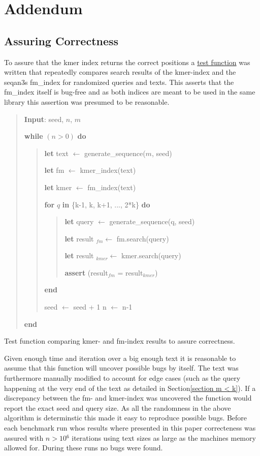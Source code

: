 
\chapter{Addendum}
\section{\label{Addendum: Correctness}Assuring Correctness}

To assure that the kmer index returns the correct positions a \href{https://github.com/google/googletest}{test function}
was written that repeatedly compares search results of the kmer-index and
the seqan3s fm\_index for randomized queries and texts. This asserts that the
fm\_index itself is bug-free and as both indices are meant to be used
in the same library this assertion was presumed to be reasonable.

\begin{algorithm}[H]
\begin{verse}
\textbf{Input}: seed, $n$, $m$

\textbf{while} $(n>0)$ \textbf{do}
\begin{verse}
\textbf{let} text $\leftarrow$ generate\_sequence($m$, seed)

\textbf{let} fm $\leftarrow$ kmer\_index(text)

\textbf{let} kmer $\leftarrow$ fm\_index(text)

\textbf{for }$q$ \textbf{in} \{k-1, k, k+1, ..., 2{*}k\} \textbf{do}
\begin{verse}
\textbf{let} query $\leftarrow$ generate\_sequence(q, seed)

\textbf{let} result $_{fm}$$\leftarrow$ fm.search(query)

\textbf{let} result $_{kmer}$$\leftarrow$ kmer.search(query)

\textbf{assert} (result$_{fm}$ = result$_{kmer}$)
\end{verse}

\textbf{end}

seed $\leftarrow$ seed + 1
n $\leftarrow$ n-1
\end{verse}

\textbf{end}
\end{verse}
\caption{Test function comparing kmer- and fm-index results to assure correctness.}
\end{algorithm}

Given enough time and iteration over a big enough text it is reasonable to assume
that this function will uncover possible bugs by itself. The text was furthermore manually
modified to account for edge cases (such
as the query happening at the very end of the text as detailed in
Section\ref{section m < k}). If a discrepancy between the fm- and kmer-index was uncovered
the function would report the exact seed and query size. As all the randomness in the above
algorithm is determinstic this made it easy to reproduce possible bugs. Before each benchmark run
whos results where presented in this paper correcteness was assured with $n>10{{}^6}$ iterations
using text sizes as large as the machines memory allowed for. During these runs no bugs were found.

